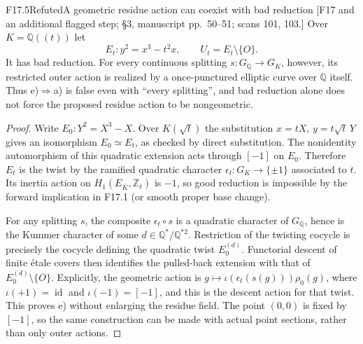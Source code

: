 \begin{result}{F17.5}{Refuted}{A geometric residue action can coexist with bad reduction}
\textup{[F17 and an additional flagged step; \S3, manuscript pp.\ 50--51;
scans 101, 103.]}
Over $K=\mathbb Q((t))$ let
\[
 E_t:y^2=x^3-t^2x,\qquad U_t=E_t\setminus\{O\}.
 \tag{F.8}
\]
It has bad reduction. For every continuous splitting
$s:G_{\mathbb Q}\to G_K$, however, its restricted outer action is
realized by a once-punctured elliptic curve over $\mathbb Q$ itself.
Thus e)$\Rightarrow$a) is false even with ``every splitting'', and
bad reduction alone does not force the proposed residue action to
be nongeometric.
\end{result}

\begin{proof}
Write $E_0:Y^2=X^3-X$. Over $K(\sqrt t)$ the substitution
$x=tX$, $y=t\sqrt t\,Y$ gives an isomorphism $E_0\simeq E_t$,
as checked by direct substitution. The nonidentity automorphism of
this quadratic extension acts through $[-1]$ on $E_0$. Therefore
$E_t$ is the twist by the ramified quadratic character
$\epsilon_t:G_K\to\{\pm1\}$ associated to $t$. Its inertia action
on $H_1(E_{\bar K},\mathbb Z_\ell)$ is $-1$, so good reduction
is impossible by the forward implication in F17.1 (or smooth
proper base change).

For any splitting $s$, the composite $\epsilon_t\circ s$ is a
quadratic character of $G_{\mathbb Q}$, hence is the Kummer
character of some $d\in\mathbb Q^*/\mathbb Q^{*2}$. Restriction
of the twisting cocycle is precisely the cocycle defining the
quadratic twist $E_0^{(d)}$. Functorial descent of finite \'etale
covers then identifies the pulled-back extension with that of
$E_0^{(d)}\setminus\{O\}$. Explicitly, the geometric action is
$g\mapsto\iota(\epsilon_t(s(g)))\rho_0(g)$, where
$\iota(+1)=\operatorname{id}$ and $\iota(-1)=[-1]$, and this is the descent action for that twist.
This proves e) without enlarging the residue field. The point
$(0,0)$ is fixed by $[-1]$, so the same construction can be made
with actual point sections, rather than only outer actions.
\end{proof}


